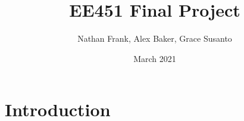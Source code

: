 \documentclass{article}
\title{EE451 Final Project}
\author{Nathan Frank, Alex Baker, Grace Susanto}
\date{March 2021}
\begin{document}
\maketitle

\section{Introduction}
\end{document}
